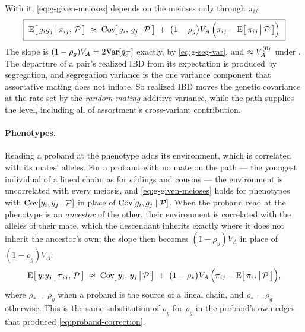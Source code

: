 \documentclass[12pt]{article}
\begin{document}
With it, \eqref{eq:g-given-meioses} depends on the meioses only through $\pi_{ij}$:
\begin{equation}\label{eq:g-given-pi}
    \boxed{\ \mathrm{E}\big[\,g_i g_j \,\big|\, \pi_{ij},\, \mathcal{P}\,\big]
    \;\approx\; \mathrm{Cov}\!\big[\,g_i,\, g_j \,\big|\, \mathcal{P}\,\big]
    \;+\; \big(1-\rho_g\big)V_A\,\Big(\pi_{ij} - \mathrm{E}\big[\,\pi_{ij} \,\big|\, \mathcal{P}\,\big]\Big) \ }
\end{equation}
The slope is $(1-\rho_g)V_A = 2\mathrm{Var}[g^\perp_o]$ exactly, by \eqref{eq:g-seg-var}, and $\approx V_A^{(0)}$ under .
The departure of a pair's realized IBD from its expectation is produced by segregation, and segregation variance is the one variance component that assortative mating does not inflate.
So realized IBD moves the genetic covariance at the rate set by the \emph{random-mating} additive variance, while the path supplies the level, including all of assortment's cross-variant contribution.

\paragraph{Phenotypes.}
Reading a proband at the phenotype adds its environment, which is correlated with its mates' alleles.
For a proband with no mate on the path --- the youngest individual of a lineal chain, as for siblings and cousins --- the environment is uncorrelated with every meiosis, and \eqref{eq:g-given-meioses} holds for phenotypes with $\mathrm{Cov}[y_i, y_j \mid \mathcal{P}]$ in place of $\mathrm{Cov}[g_i, g_j \mid \mathcal{P}]$.
When the proband read at the phenotype is an \emph{ancestor} of the other, their environment is correlated with the alleles of their mate, which the descendant inherits exactly where it does not inherit the ancestor's own; the slope then becomes $(1-\rho_y)V_A$ in place of $(1-\rho_g)V_A$:
\begin{equation}\label{eq:y-given-pi}
    \mathrm{E}\big[\,y_i y_j \,\big|\, \pi_{ij},\, \mathcal{P}\,\big]
    \;\approx\; \mathrm{Cov}\!\big[\,y_i,\, y_j \,\big|\, \mathcal{P}\,\big]
    \;+\; \big(1-\rho_\ast\big)V_A\,\Big(\pi_{ij} - \mathrm{E}\big[\,\pi_{ij} \,\big|\, \mathcal{P}\,\big]\Big) ,
\end{equation}
where $\rho_\ast = \rho_y$ when a proband is the source of a lineal chain, and $\rho_\ast = \rho_g$ otherwise.
This is the same substitution of $\rho_y$ for $\rho_g$ in the proband's own edges that produced \eqref{eq:proband-correction}.

\end{document}
